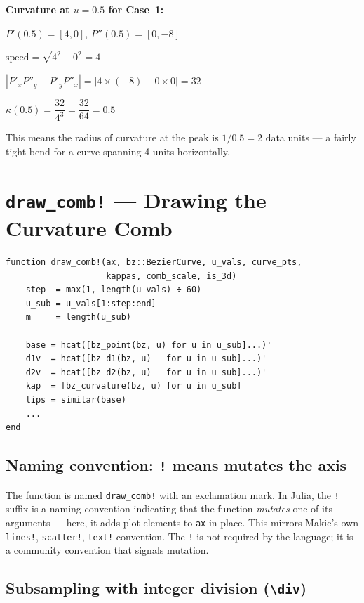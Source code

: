\documentclass[12pt, a4paper]{article}
\newcommand{\cd}[1]{\texttt{#1}}
\begin{document}
\begin{examplebox}
\textbf{Curvature at $u = 0.5$ for Case~1:}

$P'(0.5) = [4, 0]$, \quad $P''(0.5) = [0, -8]$

$\text{speed} = \sqrt{4^2 + 0^2} = 4$

$|P'_x P''_y - P'_y P''_x| = |4 \times (-8) - 0 \times 0| = 32$

$\kappa(0.5) = \dfrac{32}{4^3} = \dfrac{32}{64} = 0.5$

This means the radius of curvature at the peak is $1/0.5 = 2$
data units --- a fairly tight bend for a curve spanning
4 units horizontally.
\end{examplebox}


\section{\texttt{draw\_comb!} --- Drawing the Curvature Comb}

\begin{verbatim}
function draw_comb!(ax, bz::BezierCurve, u_vals, curve_pts,
                    kappas, comb_scale, is_3d)
    step  = max(1, length(u_vals) ÷ 60)
    u_sub = u_vals[1:step:end]
    m     = length(u_sub)

    base = hcat([bz_point(bz, u) for u in u_sub]...)'
    d1v  = hcat([bz_d1(bz, u)   for u in u_sub]...)'
    d2v  = hcat([bz_d2(bz, u)   for u in u_sub]...)'
    kap  = [bz_curvature(bz, u) for u in u_sub]
    tips = similar(base)
    ...
end
\end{verbatim}

\subsection{Naming convention: \texttt{!} means mutates the axis}

The function is named \cd{draw\_comb!} with an exclamation
mark.
In Julia, the \cd{!} suffix is a naming convention indicating
that the function \emph{mutates} one of its arguments ---
here, it adds plot elements to \cd{ax} in place.
This mirrors Makie's own \cd{lines!}, \cd{scatter!},
\cd{text!} convention.
The \cd{!} is not required by the language; it is a
community convention that signals mutation.

\subsection{Subsampling with integer division (\texttt{\textbackslash div})}
\end{document}
